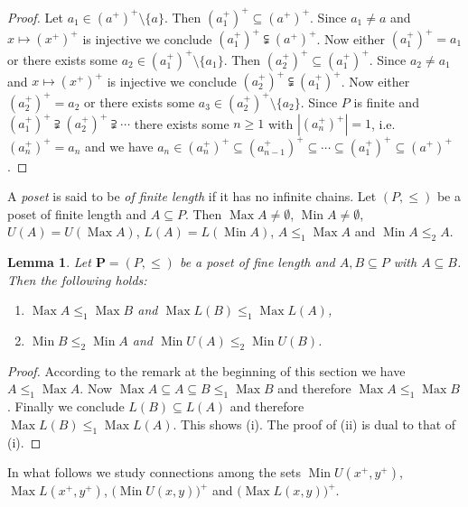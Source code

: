\documentclass[12pt]{article}
\DeclareMathOperator{\Max}{Max}
\DeclareMathOperator{\Min}{Min}
\newtheorem{lemma}[theorem]{Lemma}
\begin{document}
\begin{proof}
Let $a_1\in(a^+)^+\setminus\{a\}$. Then $(a_1^+)^+\subseteq(a^+)^+$. Since $a_1\ne a$ and $x\mapsto(x^+)^+$ is injective we conclude $(a_1^+)^+\subsetneqq(a^+)^+$. Now either $(a_1^+)^+=a_1$ or there exists some $a_2\in(a_1^+)^+\setminus\{a_1\}$. Then $(a_2^+)^+\subseteq(a_1^+)^+$. Since $a_2\ne a_1$ and $x\mapsto(x^+)^+$ is injective we conclude $(a_2^+)^+\subsetneqq(a_1^+)^+$. Now either $(a_2^+)^+=a_2$ or there exists some $a_3\in(a_2^+)^+\setminus\{a_2\}$. Since $P$ is finite and $(a_1^+)^+\supsetneqq (a_2^+)^+\supsetneqq\cdots$ there exists some $n\ge1$ with $|(a_n^+)^+|=1$, i.e.\ $(a_n^+)^+=a_n$ and we have $a_n\in(a_n^+)^+\subseteq(a_{n-1}^+)^+\subseteq\cdots\subseteq( a_1^+)^+\subseteq(a^+)^+$.
\end{proof}

A {\em poset} is said to be {\em of finite length} if it has no infinite chains. Let $(P,\le)$ be a poset of finite length and $A\subseteq P$. Then $\Max A\ne\emptyset$, $\Min A\ne\emptyset$, $U(A)=U(\Max A)$, $L(A)=L(\Min A)$, $A\le_1\Max A$ and $\Min A\le_2A$.

\begin{lemma}\label{lem1}
Let $\mathbf P=(P,\le)$ be a poset of fine length and $A,B\subseteq P$ with $A\subseteq B$. Then the following holds:
\begin{enumerate}[{\rm(i)}]
\item $\Max A\le_1\Max B$ and $\Max L(B)\le_1\Max L(A)$,
\item $\Min B\le_2\Min A$ and $\Min U(A)\le_2\Min U(B)$.
\end{enumerate}
\end{lemma}

\begin{proof}
According to the remark at the beginning of this section we have $A\le_1\Max A$. Now $\Max A\subseteq A\subseteq B\le_1\Max B$ and therefore $\Max A\le_1\Max B$. Finally we conclude $L(B)\subseteq L(A)$ and therefore $\Max L(B)\le_1\Max L(A)$. This shows (i). The proof of (ii) is dual to that of (i).
\end{proof}

In what follows we study connections among the sets $\Min U(x^+,y^+)$, $\Max L(x^+,y^+)$, $\big(\Min U(x,y)\big)^+$ and $\big(\Max L(x,y)\big)^+$.
\end{document}
